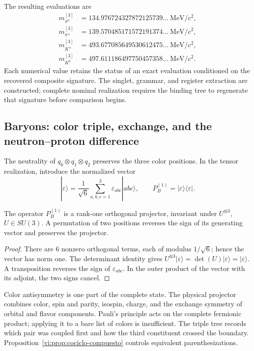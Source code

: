 The resulting evaluations are
\begin{align*}
 m_{\pi^0}^{[3]}&=134.976724327872125739\ldots\ \mathrm{MeV}/c^2,\\
 m_{\pi^\pm}^{[3]}&=139.570485171572191374\ldots\ \mathrm{MeV}/c^2,\\
 m_{K^\pm}^{[3]}&=493.677085649530612475\ldots\ \mathrm{MeV}/c^2,\\
 m_{K^0}^{[3]}&=497.611186497750457358\ldots\ \mathrm{MeV}/c^2.
\end{align*}
Each numerical value retains the
status of an exact evaluation conditioned on the recovered composite
signature. The singlet, grammar, and register extraction are
constructed; complete nominal realization requires the binding
tree to regenerate that signature before comparison begins.

\subsection{Baryons: color triple, exchange, and the neutron--proton difference}
\label{vi:subsec:bariones-familias}

The neutrality of \(q_0\otimes q_1\otimes q_2\) preserves the three
color positions. In the tensor realization, introduce the normalized
vector
\[
 |\varepsilon\rangle=\frac1{\sqrt6}
 \sum_{a,b,c=1}^3\varepsilon_{abc}|abc\rangle,
 \qquad P_B^{(1)}=|\varepsilon\rangle\langle\varepsilon|.
\]

\begin{proposition}
\label{vi:prop:singlete-barion}
The operator \(P_B^{(1)}\) is a rank-one orthogonal projector,
invariant under \(U^{\otimes3}\), \(U\in SU(3)\). A permutation
of two positions reverses the sign of its generating vector and preserves
the projector.
\end{proposition}
\begin{proof}
There are \(6\) nonzero orthogonal terms, each of modulus
\(1/\sqrt6\); hence the vector has norm one. The determinant
identity gives
\(U^{\otimes3}|\varepsilon\rangle=
\det(U)|\varepsilon\rangle=|\varepsilon\rangle\).
A transposition reverses the sign of \(\varepsilon_{abc}\). In the
outer product of the vector with its adjoint, the two signs cancel.
\end{proof}

Color antisymmetry is one part of the complete state. The physical
projector combines color, spin and parity, isospin, charge, and the exchange
symmetry of orbital and flavor components. Pauli's principle
acts on the complete fermionic product; applying it to a bare
list of colors is insufficient. The triple tree records which pair was coupled
first and how the third constituent crossed the boundary.
Proposition~\ref{vi:prop:cociclo-compuesto} controls equivalent
parenthesizations.

